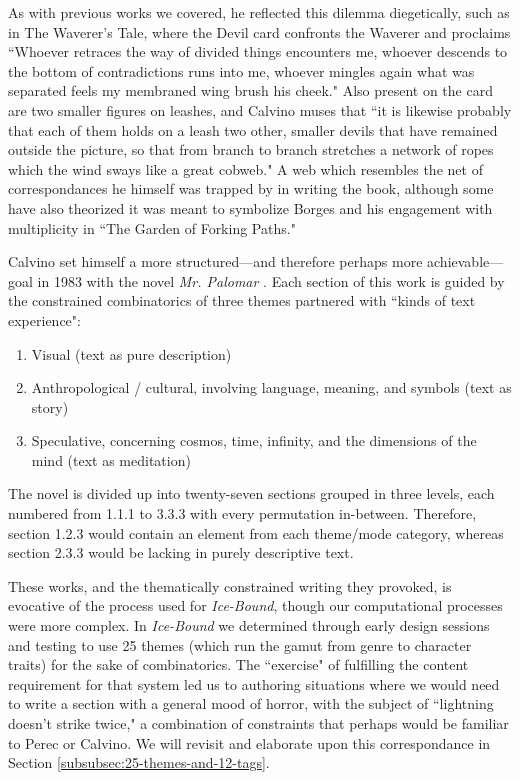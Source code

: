As with previous works we covered, he reflected this dilemma diegetically, such as in The Waverer's Tale, where the Devil card confronts the Waverer and proclaims ``Whoever retraces the way of divided things encounters me, whoever descends to the bottom of contradictions runs into me, whoever mingles again what was separated feels my membraned wing brush his cheek." Also present on the card are two smaller figures on leashes, and Calvino muses that ``it is likewise probably that each of them holds on a leash two other, smaller devils that have remained outside the picture, so that from branch to branch stretches a network of ropes which the wind sways like a great cobweb." A web which resembles the net of correspondances he himself was trapped by in writing the book, although some \cite{conte_1994} have also theorized it was meant to symbolize Borges and his engagement with multiplicity in ``The Garden of Forking Paths."

Calvino set himself a more structured---and therefore perhaps more achievable---goal in 1983 with the novel \textit{Mr. Palomar} \cite{calvino1985mister}. Each section of this work is guided by the constrained combinatorics of three themes partnered with ``kinds of text experience":

\begin{enumerate}
\item Visual (text as pure description)
\item Anthropological / cultural, involving language, meaning, and symbols (text as story)
\item Speculative, concerning cosmos, time, infinity, and the dimensions of the mind (text as  meditation)
\end{enumerate}

The novel is divided up into twenty-seven sections grouped in three levels, each numbered from 1.1.1 to 3.3.3 with every permutation in-between. Therefore, section 1.2.3 would contain an element from each theme/mode category, whereas section 2.3.3 would be lacking in purely descriptive text.

These works, and the thematically constrained writing they provoked, is evocative of the process used for \textit{Ice-Bound}, though our computational processes were more complex. In \textit{Ice-Bound} we determined through early design sessions and testing to use 25 themes (which run the gamut from genre to character traits) for the sake of combinatorics. The ``exercise" of fulfilling the content requirement for that system led us to authoring situations where we would need to write a section with a general mood of horror, with the subject of ``lightning doesn't strike twice," a combination of constraints that perhaps would be familiar to Perec or Calvino. We will revisit and elaborate upon this correspondance in Section \ref{subsubsec:25-themes-and-12-tags}.
